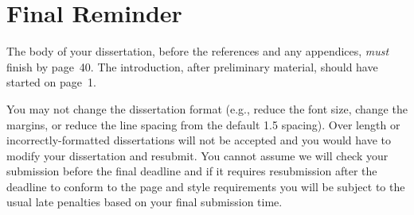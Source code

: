 \documentclass[msc,deptreport.inf]{infthesis} %
\begin{document}
\section{Final Reminder}

The body of your dissertation, before the references and any appendices,
\emph{must} finish by page~40. The introduction, after preliminary material,
should have started on page~1.

You may not change the dissertation format (e.g., reduce the font
size, change the margins, or reduce the line spacing from the default
1.5 spacing). Over length or incorrectly-formatted dissertations will
not be accepted and you would have to modify your dissertation and
resubmit.  You cannot assume we will check your submission before the
final deadline and if it requires resubmission after the deadline to
conform to the page and style requirements you will be subject to the
usual late penalties based on your final submission time.

%
%

%
%
%
\end{document}
